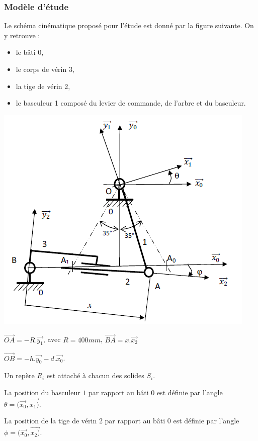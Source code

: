 \subsubsection{Modèle d'étude}
Le schéma cinématique proposé pour l'étude est donné par la figure suivante. On y retrouve :
\begin{itemize}
 \item le bâti 0,
 \item le corps de vérin 3,
 \item la tige de vérin 2,
 \item le basculeur 1 composé du levier de commande, de l'arbre et du basculeur.
\end{itemize}

\begin{minipage}{0.6\linewidth}
	\includegraphics[width=0.9\linewidth]{img/Annexe3}
\end{minipage}
\hfill
\begin{minipage}{0.35\linewidth}
$\overrightarrow{OA}=-R.\overrightarrow{y_1}$, avec $R=400mm$, $\overrightarrow{BA}=x.\overrightarrow{x_2}$

$\overrightarrow{OB}=-h.\overrightarrow{y_0}-d.\overrightarrow{x_0}$.
\end{minipage}

Un repère $R_i$ est attaché à chacun des solides $S_i$.

La position du basculeur $1$ par rapport au bâti $0$ est définie par l'angle $\theta=(\overrightarrow{x_0},\overrightarrow{x_1)}$.

La position de la tige de vérin 2 par rapport au bâti 0 est définie par l'angle $\phi=(\overrightarrow{x_0},\overrightarrow{x_2)}$.

